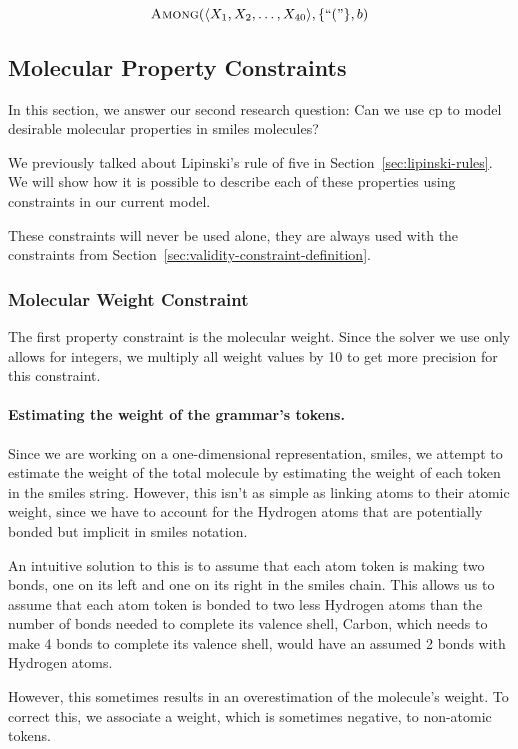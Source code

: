\documentclass[../Document.tex]{subfiles}
\begin{document}
$$
    \mbox{\sc Among}(\langle X_1, X_2, \ldots, X_{40} \rangle, \{``("\}, b)
$$


\subsection{Molecular Property Constraints}
In this section, we answer our second research question: Can we use \acrshort{cp} to model desirable molecular properties in \acrshort{smiles} molecules?

We previously talked about Lipinski's rule of five in Section~\ref{sec:lipinski-rules}. We will show how it is possible to describe each of these properties using constraints in our current model.

These constraints will never be used alone, they are always used with the constraints from Section~\ref{sec:validity-constraint-definition}.

\subsubsection{Molecular Weight Constraint}
The first property constraint is the molecular weight.
Since the solver we use only allows for integers, we multiply all weight values by 10 to get more precision for this constraint.

\paragraph{Estimating the weight of the grammar's tokens.}
Since we are working on a one-dimensional representation, \gls{smiles}, we attempt to estimate the weight of the total molecule by estimating the weight of each token in the \gls{smiles} string.
However, this isn't as simple as linking atoms to their atomic weight, since we have to account for the Hydrogen atoms that are potentially bonded but implicit in \gls{smiles} notation.

An intuitive solution to this is to assume that each atom token is making two bonds, one on its left and one on its right in the \gls{smiles} chain.
This allows us to assume that each atom token is bonded to two less Hydrogen atoms than the number of bonds needed to complete its valence shell, \eg Carbon, which needs to make 4 bonds to complete its valence shell, would have an assumed 2 bonds with Hydrogen atoms.

However, this sometimes results in an overestimation of the molecule's weight.
To correct this, we associate a weight, which is sometimes negative, to non-atomic tokens.
\end{document}

